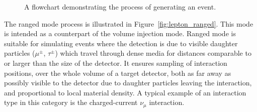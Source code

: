 \documentclass[main.tex]{subfiles}
\begin{document}
\begin{figure}[p]
    \centering
    \vspace{-3cm}
    \caption{A flowchart demonstrating the process of generating an event.}\label{fig:flowevent}
\end{figure}

The ranged mode process is illustrated in Figure~\ref{fig:lepton_ranged}.
This mode is intended as a counterpart of the volume injection mode.
Ranged mode is suitable for simulating events where the detection is due to visible daughter particles ($\mu^\pm$, $\tau^\pm$) which travel through dense media for distances comparable to or larger than the size of the detector.
It ensures sampling of interaction positions, over the whole volume of a target detector, both as far away as possibly visible to the detector due to daughter particles leaving the interaction, and proportional to local material density.
A typical example of an interaction type in this category is the charged-current $\nu_\mu$ interaction. 
\end{document}
